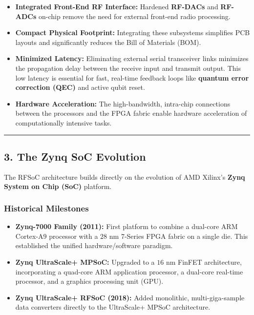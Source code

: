 \documentclass[
]{article}
\providecommand{\tightlist}{%
  \setlength{\itemsep}{0pt}\setlength{\parskip}{0pt}}
\begin{document}
\begin{itemize}
\tightlist
\item
  \textbf{Integrated Front-End RF Interface:} Hardened \textbf{RF-DACs}
  and \textbf{RF-ADCs} on-chip remove the need for external front-end
  radio processing.
\item
  \textbf{Compact Physical Footprint:} Integrating these subsystems
  simplifies PCB layouts and significantly reduces the Bill of Materials
  (BOM).
\item
  \textbf{Minimized Latency:} Eliminating external serial transceiver
  links minimizes the propagation delay between the receive input and
  transmit output. This low latency is essential for fast, real-time
  feedback loops like \textbf{quantum error correction (QEC)} and active
  qubit reset.
\item
  \textbf{Hardware Acceleration:} The high-bandwidth, intra-chip
  connections between the processors and the FPGA fabric enable hardware
  acceleration of computationally intensive tasks.
\end{itemize}

\begin{center}\rule{0.5\linewidth}{0.5pt}\end{center}

\subsection{3. The Zynq SoC Evolution}\label{the-zynq-soc-evolution}

The RFSoC architecture builds directly on the evolution of AMD Xilinx's
\textbf{Zynq System on Chip (SoC)} platform.

\subsubsection{Historical Milestones}\label{historical-milestones}

\begin{itemize}
\tightlist
\item
  \textbf{Zynq-7000 Family (2011):} First platform to combine a
  dual-core ARM Cortex-A9 processor with a \(28\text{ nm}\) 7-Series
  FPGA fabric on a single die. This established the unified
  hardware/software paradigm.
\item
  \textbf{Zynq UltraScale+ MPSoC:} Upgraded to a \(16\text{ nm}\) FinFET
  architecture, incorporating a quad-core ARM application processor, a
  dual-core real-time processor, and a graphics processing unit (GPU).
\item
  \textbf{Zynq UltraScale+ RFSoC (2018):} Added monolithic,
  multi-giga-sample data converters directly to the UltraScale+ MPSoC
  architecture.
\end{itemize}
\end{document}
